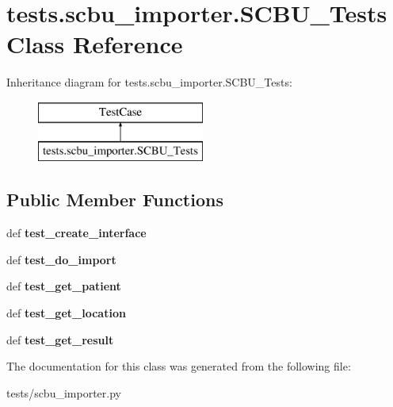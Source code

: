 \hypertarget{classtests_1_1scbu__importer_1_1_s_c_b_u___tests}{\section{tests.\-scbu\-\_\-importer.\-S\-C\-B\-U\-\_\-\-Tests Class Reference}
\label{classtests_1_1scbu__importer_1_1_s_c_b_u___tests}
}
Inheritance diagram for tests.\-scbu\-\_\-importer.\-S\-C\-B\-U\-\_\-\-Tests\-:\begin{figure}[H]
\begin{center}
\leavevmode
\includegraphics[height=2.000000cm]{classtests_1_1scbu__importer_1_1_s_c_b_u___tests}
\end{center}
\end{figure}
\subsection*{Public Member Functions}
\begin{DoxyCompactItemize}
\item 
\hypertarget{classtests_1_1scbu__importer_1_1_s_c_b_u___tests_ae8554d0a16d6e2c85e640527573d89f6}{def {\bfseries test\-\_\-create\-\_\-interface}}\label{classtests_1_1scbu__importer_1_1_s_c_b_u___tests_ae8554d0a16d6e2c85e640527573d89f6}

\item 
\hypertarget{classtests_1_1scbu__importer_1_1_s_c_b_u___tests_aa72ca14218b25daa974eae95a4b742c1}{def {\bfseries test\-\_\-do\-\_\-import}}\label{classtests_1_1scbu__importer_1_1_s_c_b_u___tests_aa72ca14218b25daa974eae95a4b742c1}

\item 
\hypertarget{classtests_1_1scbu__importer_1_1_s_c_b_u___tests_aaa6cb756780e5d15b4b05879c029553a}{def {\bfseries test\-\_\-get\-\_\-patient}}\label{classtests_1_1scbu__importer_1_1_s_c_b_u___tests_aaa6cb756780e5d15b4b05879c029553a}

\item 
\hypertarget{classtests_1_1scbu__importer_1_1_s_c_b_u___tests_a8951def68b8e0dff5185611260d14130}{def {\bfseries test\-\_\-get\-\_\-location}}\label{classtests_1_1scbu__importer_1_1_s_c_b_u___tests_a8951def68b8e0dff5185611260d14130}

\item 
\hypertarget{classtests_1_1scbu__importer_1_1_s_c_b_u___tests_a65015ae87467710ad7e0e60cb5cd9282}{def {\bfseries test\-\_\-get\-\_\-result}}\label{classtests_1_1scbu__importer_1_1_s_c_b_u___tests_a65015ae87467710ad7e0e60cb5cd9282}

\end{DoxyCompactItemize}


The documentation for this class was generated from the following file\-:\begin{DoxyCompactItemize}
\item 
tests/scbu\-\_\-importer.\-py\end{DoxyCompactItemize}
